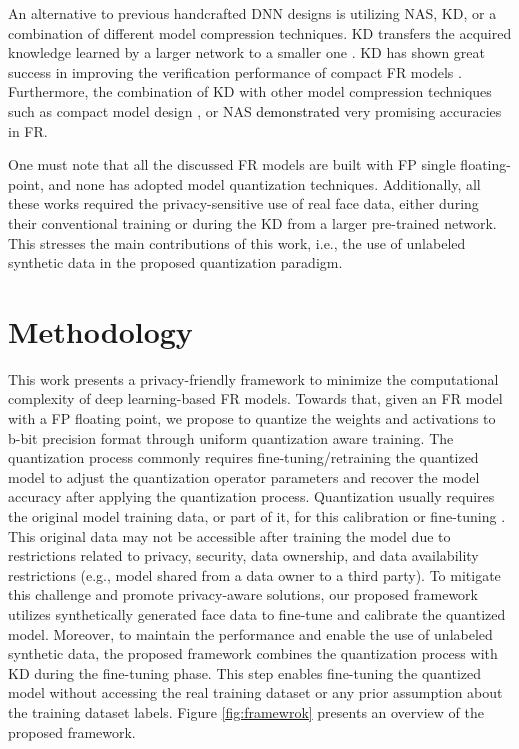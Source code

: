 \documentclass[a4paper,conference]{IEEEtran}
\begin{document}
An alternative to previous handcrafted DNN designs is utilizing NAS, KD, or a combination of different model compression techniques.
KD transfers the acquired knowledge learned by a larger network to a smaller one \cite{DBLP:journals/corr/HintonVD15,marco_FG}. KD has shown great success in improving the verification performance of compact FR models \cite{pocketnet,vargfacenet,s22051921}.
Furthermore, the combination of KD with other model compression techniques such as compact model design \cite{vargfacenet}, or NAS \cite{DBLP:conf/aaai/Wang21,pocketnet} \textcolor{black}{ demonstrated} very promising accuracies in FR. 

One must note that all the discussed FR models are built with FP single floating-point, and none has adopted model quantization techniques.
Additionally, all these works required the privacy-sensitive use of real face data, either during their conventional training or during the KD from a larger pre-trained network. This stresses the main contributions of this work, i.e., the use of unlabeled synthetic data in the proposed quantization paradigm.









\vspace{-1mm}
\section{Methodology}
\label{sec:methodogy}
\vspace{-1mm}
This work presents a privacy-friendly framework to minimize the computational complexity of deep learning-based FR models.
Towards that, given an FR model with a FP floating point, we propose to quantize the weights and activations to b-bit precision format through uniform quantization aware training.   
The quantization process commonly requires fine-tuning/retraining the quantized model to adjust the quantization operator parameters and recover the model accuracy after applying the quantization process.  
Quantization usually requires the original model training data, or part of it, for this calibration or fine-tuning \cite{DBLP:conf/cvpr/JacobKCZTHAK18}.
This original data may not be accessible after training the model due to restrictions related to privacy, security, data ownership, and data availability restrictions (e.g., model shared from a data owner to a third party). 
To mitigate this challenge and promote privacy-aware solutions, our proposed framework utilizes synthetically generated face data to fine-tune and calibrate the quantized model.
Moreover, to maintain the performance and enable the use of unlabeled synthetic data, the proposed framework combines the quantization process with KD during the fine-tuning phase. This step enables fine-tuning the quantized model without accessing the real training dataset or any prior assumption about the training dataset labels.
Figure \ref{fig:framewrok} presents an overview of the proposed framework.
\end{document}
